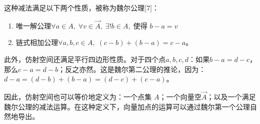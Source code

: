 这种减法满足以下两个性质，被称为魏尔公理[7]：
\begin{enumerate}
\item 唯一解公理$\forall a \in A, \;\forall v \in \overrightarrow{A}, \;\exists! b \in A, \;\text{使得 } b - a = v$
\item 链式相加公理$\forall a, b, c \in A, \;(c - b) + (b - a) = c - a$。
\end{enumerate}
此外，仿射空间还满足平行四边形性质。对于四个点$a, b, c, d$：如果$b - a = d - c$，那么$c - a = d - b$；反之亦然。这是魏尔第二公理的推论，因为：$
d - a = (d - b) + (b - a) = (d - c) + (c - a)$。

因此，仿射空间也可以等价地定义为：一个点集 $A$；一个向量空$\overrightarrow{A}$；以及一个满足魏尔公理的减法运算。在这种定义下，向量加点的运算可以通过魏尔第一个公理自然地导出。
